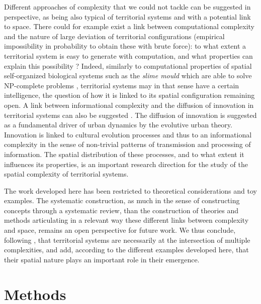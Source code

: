 \documentclass[fleqn,10pt]{wlscirep}
\begin{document}
Different approaches of complexity that we could not tackle can be suggested in perspective, as being also typical of territorial systems and with a potential link to space. There could for example exist a link between computational complexity and the nature of large deviation of territorial configurations (empirical impossibility in probability to obtain these with brute force): to what extent a territorial system is easy to generate with computation, and what properties can explain this possibility ? Indeed, similarly to computational properties of spatial self-organized biological systems such as the \emph{slime mould} which are able to solve NP-complete problems \cite{zhu2013amoeba}, territorial systems may in that sense have a certain intelligence, the question of how it is linked to its spatial configuration remaining open. A link between informational complexity and the diffusion of innovation in territorial systems can also be suggested \cite{favaro2011gibrat}. The diffusion of innovation is suggested as a fundamental driver of urban dynamics by the evolutive urban theory. Innovation is linked to cultural evolution processes \cite{Mesoudi25072017} and thus to an informational complexity in the sense of non-trivial patterns of transmission and processing of information. The spatial distribution of these processes, and to what extent it influences its properties, is an important research direction for the study of the spatial complexity of territorial systems.


The work developed here has been restricted to theoretical considerations and toy examples. The systematic construction, as much in the sense of constructing concepts through a systematic review, than the construction of theories and methods articulating in a relevant way these different links between complexity and space, remains an open perspective for future work. We thus conclude, following \cite{raimbault2017complexity}, that territorial systems are necessarily at the intersection of multiple complexities, and add, according to the different examples developed here, that their spatial nature plays an important role in their emergence.







\section*{Methods}
\end{document}
